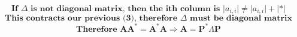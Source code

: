 \documentclass[10pt]{article}
\begin{document}
$$\textbf{If }\Delta\textbf{ is not diagonal matrix, then the ith column is }\lvert a_{i,i} \rvert \neq \lvert a_{i,i} \rvert + \lvert \ast \rvert$$
$$\textbf{This contracts our previous (3), therefore }\Delta\textbf{ must be diagonal matrix}$$
$$\textbf{Therefore }\textbf{A}\textbf{A}^\ast = \textbf{A}^\ast\textbf{A}\Rightarrow\textbf{A}=\textbf{P}^\ast\Lambda\textbf{P}$$
\end{document}
